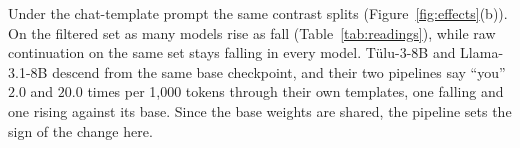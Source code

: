 Under the chat-template prompt the same contrast splits (Figure~\ref{fig:effects}(b)). On the filtered set as many models rise as fall (Table~\ref{tab:readings}), while raw continuation on the same set stays falling in every model. T\"ulu-3-8B and Llama-3.1-8B descend from the same base checkpoint, and their two pipelines say ``you'' $2.0$ and $20.0$ times per 1,000 tokens through their own templates, one falling and one rising against its base. Since the base weights are shared, the pipeline sets the sign of the change here.
